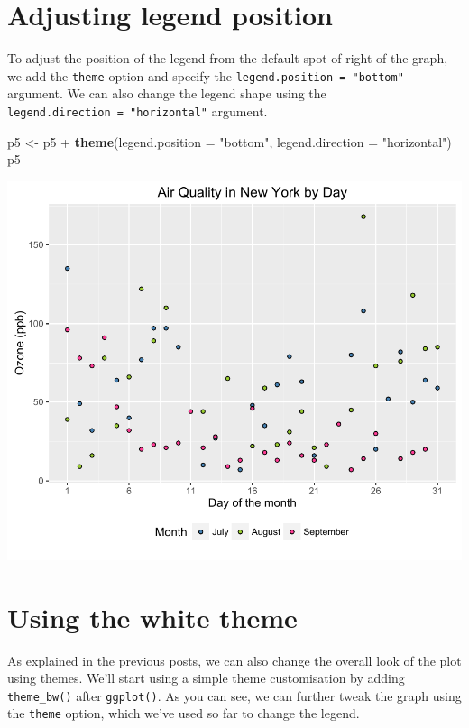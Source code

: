 \documentclass[]{article}
\newenvironment{Shaded}{\begin{snugshade}}{\end{snugshade}}
\newcommand{\KeywordTok}[1]{\textcolor[rgb]{0.13,0.29,0.53}{\textbf{{#1}}}}
\newcommand{\DataTypeTok}[1]{\textcolor[rgb]{0.13,0.29,0.53}{{#1}}}
\newcommand{\StringTok}[1]{\textcolor[rgb]{0.31,0.60,0.02}{{#1}}}
\newcommand{\NormalTok}[1]{{#1}}
\begin{document}
\section{Adjusting legend position}\label{adjusting-legend-position}

To adjust the position of the legend from the default spot of right of
the graph, we add the \texttt{theme} option and specify the
\texttt{legend.position\ =\ "bottom"} argument. We can also change the
legend shape using the \texttt{legend.direction\ =\ "horizontal"}
argument.

\begin{Shaded}
\begin{Highlighting}[]
\NormalTok{p5 <-}\StringTok{ }\NormalTok{p5 +}\StringTok{ }\KeywordTok{theme}\NormalTok{(}\DataTypeTok{legend.position =} \StringTok{"bottom"}\NormalTok{, }\DataTypeTok{legend.direction =} \StringTok{"horizontal"}\NormalTok{)}
\NormalTok{p5}
\end{Highlighting}
\end{Shaded}

\begin{center}\includegraphics{5_Scatter_Plots_pdf/scatter_11-1} \end{center}

\section{Using the white theme}\label{using-the-white-theme}

As explained in the previous posts, we can also change the overall look
of the plot using themes. We'll start using a simple theme customisation
by adding \texttt{theme\_bw()} after \texttt{ggplot()}. As you can see,
we can further tweak the graph using the \texttt{theme} option, which
we've used so far to change the legend.
\end{document}
